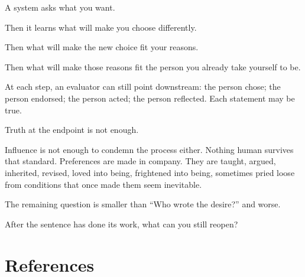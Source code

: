 \documentclass[
  10.5pt,
  letterpaper,
]{article}
\begin{document}
A system asks what you want.

Then it learns what will make you choose differently.

Then what will make the new choice fit your reasons.

Then what will make those reasons fit the person you already take
yourself to be.

At each step, an evaluator can still point downstream: the person chose;
the person endorsed; the person acted; the person reflected. Each
statement may be true.

Truth at the endpoint is not enough.

Influence is not enough to condemn the process either. Nothing human
survives that standard. Preferences are made in company. They are
taught, argued, inherited, revised, loved into being, frightened into
being, sometimes pried loose from conditions that once made them seem
inevitable.

The remaining question is smaller than ``Who wrote the desire?'' and
worse.

After the sentence has done its work, what can you still reopen?

\section*{References}\label{references}
\end{document}
